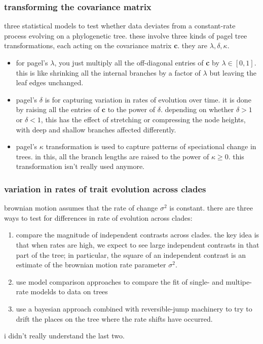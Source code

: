\documentclass{article}
\newcommand{\bnote}[1]{{\blue #1 }} %
\begin{document}
\subsubsection{transforming the covariance matrix}
three statistical models to test whether data deviates from a constant-rate
process evolving on a phylogenetic tree. these involve three kinds of pagel tree
transformations, each acting on the covariance matrix $\mathbf{c}$. they are $\lambda,\delta,\kappa$.
\begin{itemize}
  \item for pagel's $\lambda$, you just multiply all the off-diagonal entries of
  \textbf{c} by $\lambda\in [0,1]$. this is like shrinking all the internal
  branches by a factor of $\lambda$ but leaving the leaf edges unchanged.
  \item pagel's $\delta$ is for capturing variation in rates of evolution over time. it
  is done by raising all the entries of $\mathbf{c}$ to the power of $\delta$.
  depending on whether $\delta>1$ or $\delta<1$, this has the effect of stretching
  or compressing the node heights, with deep and shallow branches affected
  differently.
  \item pagel's $\kappa$ transformation is used to capture patterns of speciational
  change in trees. in this, all the branch lengths are raised to the power of
  $\kappa\geq 0$. this transformation isn't really used anymore.
\end{itemize}
\subsubsection{variation in rates of trait evolution across clades}
brownian motion assumes that the rate of change $\sigma^{2}$ is constant. there
are three ways to test for differences in rate of evolution across clades:
\begin{enumerate}
\item compare the magnitude of independent contrasts across clades. the key idea
  is that when rates are high, we expect to see large independent contrasts in
  that part of the tree; in particular, the square of an independent contrast is
  an estimate of the brownian motion rate parameter $\sigma^{2}$.
\item use model comparison approaches to compare the fit of single- and
  multipe-rate modelds to data on trees
\item use a bayesian approach combined with reversible-jump machinery to try to
  drift the places on the tree where the rate shifts have occurred.
\end{enumerate}
\bnote{i didn't really understand the last two.}
\end{document}
